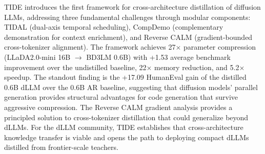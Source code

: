 \documentclass[11pt]{article}
\begin{document}
TIDE introduces the first framework for cross-architecture distillation of diffusion LLMs, addressing three fundamental challenges through modular components: TIDAL (dual-axis temporal scheduling), CompDemo (complementary demonstration for context enrichment), and Reverse CALM (gradient-bounded cross-tokenizer alignment). The framework achieves 27$\times$ parameter compression (LLaDA2.0-mini 16B $\to$ BD3LM 0.6B) with +1.53 average benchmark improvement over the undistilled baseline, 22$\times$ memory reduction, and 5.2$\times$ speedup. The standout finding is the +17.09 HumanEval gain of the distilled 0.6B dLLM over the 0.6B AR baseline, suggesting that diffusion models' parallel generation provides structural advantages for code generation that survive aggressive compression. The Reverse CALM gradient analysis provides a principled solution to cross-tokenizer distillation that could generalize beyond dLLMs. For the dLLM community, TIDE establishes that cross-architecture knowledge transfer is viable and opens the path to deploying compact dLLMs distilled from frontier-scale teachers.
\end{document}
